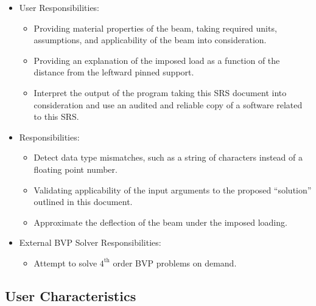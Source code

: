\documentclass[12pt]{article}
\begin{document}
\begin{itemize}
    \item User Responsibilities:
          \begin{itemize}

              \item Providing material properties of the beam, taking required
                    units, assumptions, and applicability of the beam into
                    consideration.

              \item Providing an explanation of the imposed load as a function
                    of the distance from the leftward pinned support.

              \item Interpret the output of the program taking this SRS document
                    into consideration and use an audited and reliable copy of a
                    software related to this SRS.

          \end{itemize}

    \item \progname{} Responsibilities:
          \begin{itemize}

              \item Detect data type mismatches, such as a string of characters
                    instead of a floating point number.

              \item Validating applicability of the input arguments to the
                    proposed ``solution'' outlined in this document.

              \item Approximate the deflection of the beam under the imposed
                    loading.

          \end{itemize}

    \item External BVP Solver Responsibilities:
          \begin{itemize}
            
            \item Attempt to solve $4^{\text{th}}$ order BVP problems on demand.

          \end{itemize}
\end{itemize}

\subsection{User Characteristics}
\label{SecUserCharacteristics}
\end{document}
